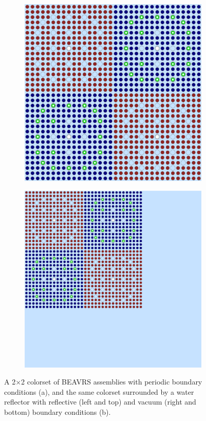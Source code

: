 \documentclass[12pt,twoside]{mitthesis-exec}
\begin{document}
\begin{figure}[h!]
\centering
\begin{subfigure}{0.47\textwidth}
  \centering
  \includegraphics[width=0.9\linewidth]{figures/benchmarks/2x2}
  \caption{}
  \label{fig:2x2}
\end{subfigure}%
\begin{subfigure}{0.47\textwidth}
  \centering
  \includegraphics[width=0.9\linewidth]{figures/benchmarks/reflector}
  \caption{}
  \label{fig:reflector}
\end{subfigure}
\caption[A reflected 2$\times$2 colorset]{A 2$\times$2 colorset of BEAVRS assemblies with periodic boundary conditions (a), and the same colorset surrounded by a water reflector with reflective (left and top) and vacuum (right and bottom) boundary conditions (b).}
\label{fig:benchmark-geometries}
\end{figure}
\end{document}
